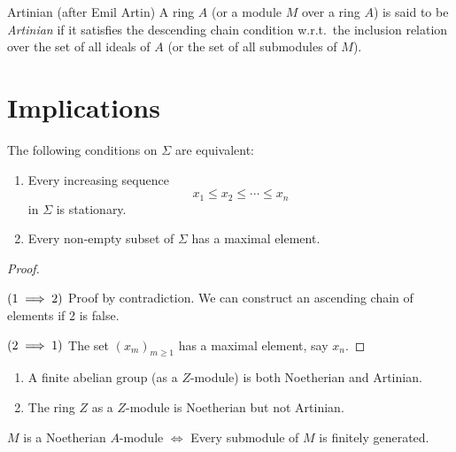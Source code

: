 \begin{definition}{Artinian (after Emil Artin)}{}{}
	A ring \(A\) (or a module \(M\) over a ring \(A\)) is said to be
	\emph{Artinian} if it satisfies the descending chain condition
	w.r.t.\ the inclusion relation over the set of all ideals of \(A\)
	(or the set of all submodules of \(M\)).
\end{definition}


\section{Implications}

\begin{proposition}{}{}
	The following conditions on \(\Sigma\) are equivalent:
	\begin{enumerate}
		\item Every increasing sequence
		\[
			x_1 \leq x_2 \leq \cdots \leq x_n
		\]
		in \(\Sigma\) is stationary.
		\item Every non-empty subset of \(\Sigma\) has a maximal element.
	\end{enumerate}
\end{proposition}

\begin{proof} \

	\(\left( 1 \implies 2 \right)\)
	Proof by contradiction.
	We can construct an ascending chain of elements if 2 is false.

	\(\left( 2 \implies 1 \right)\)
	The set \((x_m)_{m \geq 1}\) has a maximal element, say \(x_n\).
\end{proof}

\begin{example}{}{}
	\begin{enumerate}
		\item A finite abelian group (as a \(Z\)-module) is both Noetherian
		and Artinian.
		\item The ring \(Z\) as a \(Z\)-module is Noetherian but not Artinian.
	\end{enumerate}
\end{example}

\begin{proposition}{}{}
	\(M\) is a Noetherian \(A\)-module \(\iff\) Every submodule
	of \(M\) is finitely generated.
\end{proposition}

